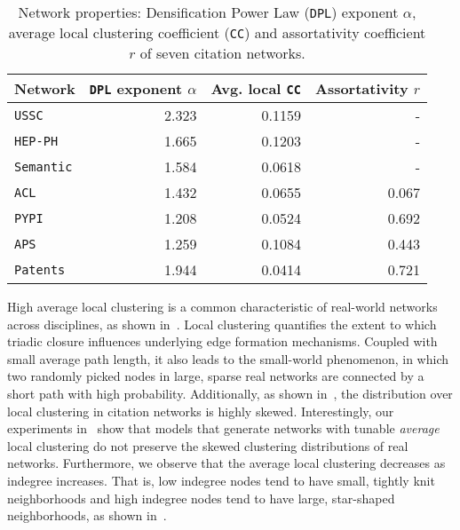 \begin{table}[H]
 \center
 \caption{Network properties: Densification Power Law (\texttt{DPL}) exponent $\alpha$,
 average local clustering coefficient (\texttt{CC}) and assortativity coefficient
 $r$ of seven citation networks.}
 \label{table:netstats}
 {
  \begin{tabular}[c]{lrrr} \toprule
  Network &  \texttt{DPL} exponent $\alpha$       & Avg. local \texttt{CC}  & Assortativity $r$  \\ \midrule
  \texttt{USSC}         & 2.323     & 0.1159    & -    \\
  \texttt{HEP-PH}       & 1.665     & 0.1203    & -   \\
  \texttt{Semantic}     & 1.584     & 0.0618    & -   \\   \midrule
  \texttt{ACL}          & 1.432     & 0.0655    & 0.067   \\
  \texttt{PYPI}         & 1.208     & 0.0524    & 0.692   \\
  \texttt{APS}          & 1.259     & 0.1084    & 0.443   \\
  \texttt{Patents}      & 1.944     & 0.0414    & 0.721   \\
   \bottomrule
  \end{tabular}
 }
\end{table}

High average local clustering is a common characteristic of real-world networks
across disciplines, as shown in~. Local clustering
quantifies the extent to which triadic closure influences underlying edge
formation mechanisms. Coupled with small average path length, it also leads to
the small-world phenomenon, in which two randomly picked nodes in large, sparse
real networks are connected by a short path with high probability. Additionally, as shown in~,
the distribution over local clustering in citation networks is highly skewed. Interestingly, our experiments
in~ show that models \cite{klemm2002highly,holme2002growing} that generate
networks with tunable \textit{average} local clustering do not preserve the skewed clustering
distributions of real networks. Furthermore, we observe that the average local clustering decreases as indegree increases.
That is, low indegree nodes tend to have
small, tightly knit neighborhoods and high indegree nodes tend to have large,
star-shaped neighborhoods, as shown
in~.


